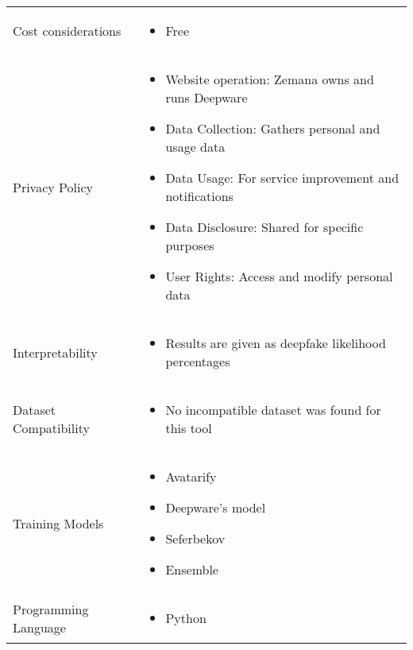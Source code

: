 \begin{table}[htpb]
\begin{tabularx}{\textwidth}{l X}
		Cost considerations          & \begin{itemize}
			                               \item Free
		                               \end{itemize}                                             \\
		\addlinespace
		Privacy Policy               & \begin{itemize}
			                               \item Website operation: Zemana owns and runs Deepware
			                               \item Data Collection: Gathers personal and usage data
			                               \item Data Usage: For service improvement and notifications
			                               \item Data Disclosure: Shared for specific purposes
			                               \item User Rights: Access and modify personal data
		                               \end{itemize} \\
		\addlinespace
		Interpretability             & \begin{itemize}
			                               \item Results are given as deepfake likelihood percentages
		                               \end{itemize}  \\
		\addlinespace
		Dataset Compatibility        & \begin{itemize}
			                               \item No incompatible dataset was found for this tool
		                               \end{itemize}       \\
		\addlinespace
		Training Models              & \begin{itemize}
			                               \item Avatarify
			                               \item Deepware's model
			                               \item Seferbekov
			                               \item Ensemble
		                               \end{itemize}                                      \\
		\addlinespace
		Programming Language         & \begin{itemize}
			                               \item Python
		                               \end{itemize}                                             \\
		\bottomrule
	\end{tabularx}
\end{table}

